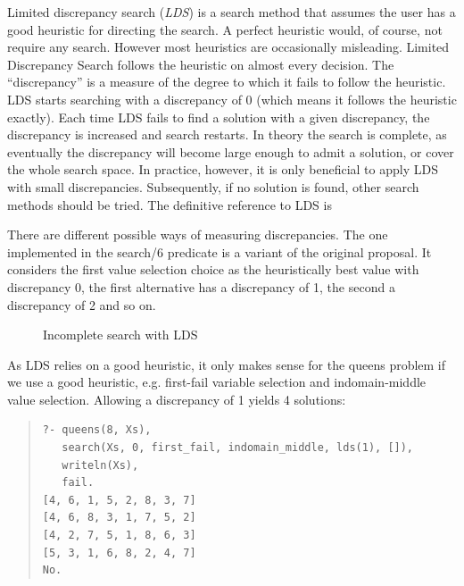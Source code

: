 Limited discrepancy search ({\em LDS}) is a search method that assumes
the user has a good heuristic for directing the search.  A perfect
heuristic would, of course, not require any search.  However most
heuristics are occasionally misleading.  Limited Discrepancy Search
follows the heuristic on almost every decision.  The
``discrepancy'' is a measure of the degree to which it fails to follow
the heuristic.  LDS starts searching with a discrepancy of $0$ (which
means it follows the heuristic exactly).  Each time LDS fails to find
a solution with a given discrepancy, the discrepancy is increased and
search restarts.  In theory the search is complete, as eventually the
discrepancy will become large enough to admit a solution, or cover
the whole search space.  In practice, however, it is only beneficial
to apply LDS with small discrepancies.  Subsequently, if no solution
is found, other search methods should be tried.
The definitive reference to LDS is \cite{harvey95:lds:inp}

There are different possible ways of measuring discrepancies.
The one implemented in the search/6 predicate is a variant of the
original proposal. It considers the first
value selection choice as the heuristically best value with
discrepancy 0, the first alternative has a discrepancy of 1, the
second a discrepancy of 2 and so on.
\begin{figure}
\begin{center}
\end{center}
\caption{Incomplete search with LDS}
\label{figlds}
\end{figure}

As LDS relies on a good heuristic, it only makes sense for the queens
problem if we use a good heuristic, e.g. first-fail variable selection
and indomain-middle value selection. Allowing a discrepancy of 1 yields
4 solutions:
\begin{quote}\begin{verbatim}
?- queens(8, Xs), 
   search(Xs, 0, first_fail, indomain_middle, lds(1), []),
   writeln(Xs),
   fail.
[4, 6, 1, 5, 2, 8, 3, 7]
[4, 6, 8, 3, 1, 7, 5, 2]
[4, 2, 7, 5, 1, 8, 6, 3]
[5, 3, 1, 6, 8, 2, 4, 7]
No.
\end{verbatim}\end{quote}

